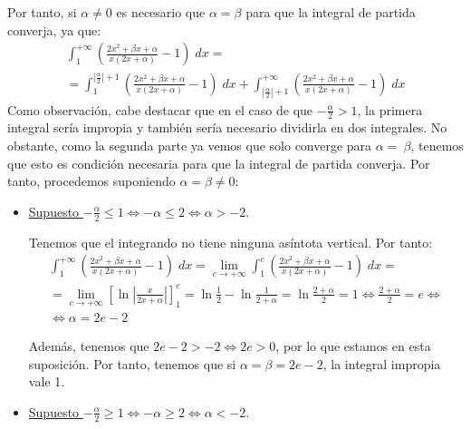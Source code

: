 \begin{ejercicio}
\begin{itemize}
       Por tanto, si $\alpha \neq 0$ es necesario que $\alpha = \beta$ para que la integral de partida converja, ya que:
       \begin{multline*}
           \int_1^{+\infty} \left(\frac{2x^2+\beta x+\alpha}{x(2x+\alpha)}-1\right)\;dx
           =\\= \int^{\left|\frac{\alpha}{2}\right|+1}_1 \left(\frac{2x^2+\beta x+\alpha}{x(2x+\alpha)}-1\right)\;dx
           +
           \int_{\left|\frac{\alpha}{2}\right|+1}^{+\infty} \left(\frac{2x^2+\beta x+\alpha}{x(2x+\alpha)}-1\right)\;dx
       \end{multline*}
       Como observación, cabe destacar que en el caso de que $-\frac{\alpha}{2}>1$, la primera integral sería impropia y también sería necesario dividirla en dos integrales. No obstante, como la segunda parte ya vemos que solo converge para $\alpha=~\beta$, tenemos que esto es condición necesaria para que la integral de partida converja. Por tanto, procedemos suponiendo $\alpha = \beta\neq 0$:
       \begin{itemize}
           \item \underline{Supuesto $-\frac{\alpha}{2}\leq 1\Longleftrightarrow -\alpha \leq 2 \Longleftrightarrow \alpha > -2$}.

            Tenemos que el integrando no tiene ninguna asíntota vertical. Por tanto:
            \begin{multline*}
               \int_1^{+\infty} \left(\frac{2x^2+\beta x+\alpha}{x(2x+\alpha)}-1\right)\;dx
               =
               \lim_{c\to +\infty} \int_1^{c} \left(\frac{2x^2+\beta x+\alpha}{x(2x+\alpha)}-1\right)\;dx =\\= \lim_{c\to +\infty} \left[\ln \left|\frac{x}{2x+\alpha}\right|\right]_1^{c} = \ln \frac{1}{2} - \ln \frac{1}{2+\alpha} = \ln \frac{2+\alpha}{2} = 1 \Longleftrightarrow \frac{2+\alpha}{2} = e \Longleftrightarrow \\ \Longleftrightarrow
               \alpha = 2e-2
           \end{multline*}
    
           Además, tenemos que $2e-2 >-2 \Longleftrightarrow 2e>0$, por lo que estamos en esta suposición. Por tanto, tenemos que si $\alpha = \beta = 2e-2$, la integral impropia vale 1.




           \item \underline{Supuesto $-\frac{\alpha}{2}\geq 1\Longleftrightarrow -\alpha \geq 2 \Longleftrightarrow \alpha < -2$}.


\end{itemize}
\end{itemize}
\end{ejercicio}
